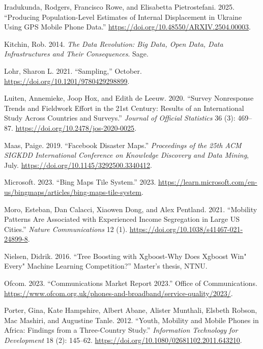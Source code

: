 \documentclass{article}
\newlength{\cslhangindent}
\newenvironment{CSLReferences}[2] %
 {\begin{list}{}{%
  \setlength{\itemindent}{0pt}
  \setlength{\leftmargin}{0pt}
  \setlength{\parsep}{0pt}
  \ifodd #1
   \setlength{\leftmargin}{\cslhangindent}
   \setlength{\itemindent}{-1\cslhangindent}
  \fi
  \setlength{\itemsep}{#2\baselineskip}}}
 {\end{list}}
\begin{document}
\begin{CSLReferences}{1}{0}
Iradukunda, Rodgers, Francisco Rowe, and Elisabetta Pietrostefani. 2025. {``Producing Population-Level Estimates of Internal Displacement in Ukraine Using GPS Mobile Phone Data.''} \url{https://doi.org/10.48550/ARXIV.2504.00003}.

Kitchin, Rob. 2014. \emph{The Data Revolution: Big Data, Open Data, Data Infrastructures and Their Consequences}. Sage.

Lohr, Sharon L. 2021. {``Sampling,''} October. \url{https://doi.org/10.1201/9780429298899}.

Luiten, Annemieke, Joop Hox, and Edith de Leeuw. 2020. {``Survey Nonresponse Trends and Fieldwork Effort in the 21st Century: Results of an International Study Across Countries and Surveys.''} \emph{Journal of Official Statistics} 36 (3): 469--87. \url{https://doi.org/10.2478/jos-2020-0025}.

Maas, Paige. 2019. {``Facebook Disaster Maps.''} \emph{Proceedings of the 25th ACM SIGKDD International Conference on Knowledge Discovery and Data Mining}, July. \url{https://doi.org/10.1145/3292500.3340412}.

Microsoft. 2023. {``Bing Maps Tile System.''} 2023. \url{https://learn.microsoft.com/en-us/bingmaps/articles/bing-maps-tile-system}.

Moro, Esteban, Dan Calacci, Xiaowen Dong, and Alex Pentland. 2021. {``Mobility Patterns Are Associated with Experienced Income Segregation in Large US Cities.''} \emph{Nature Communications} 12 (1). \url{https://doi.org/10.1038/s41467-021-24899-8}.

Nielsen, Didrik. 2016. {``Tree Boosting with Xgboost-Why Does Xgboost Win" Every" Machine Learning Competition?''} Master's thesis, NTNU.

Ofcom. 2023. {``Communications Market Report 2023.''} Office of Communications. \url{https://www.ofcom.org.uk/phones-and-broadband/service-quality/2023/}.

Porter, Gina, Kate Hampshire, Albert Abane, Alister Munthali, Elsbeth Robson, Mac Mashiri, and Augustine Tanle. 2012. {``Youth, Mobility and Mobile Phones in Africa: Findings from a Three-Country Study.''} \emph{Information Technology for Development} 18 (2): 145--62. \url{https://doi.org/10.1080/02681102.2011.643210}.


\end{CSLReferences}
\end{document}

